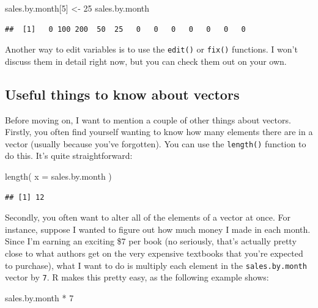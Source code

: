 \documentclass[
]{book}
\newenvironment{Shaded}{\begin{snugshade}}{\end{snugshade}}
\newcommand{\AttributeTok}[1]{\textcolor[rgb]{0.77,0.63,0.00}{#1}}
\newcommand{\DecValTok}[1]{\textcolor[rgb]{0.00,0.00,0.81}{#1}}
\newcommand{\FunctionTok}[1]{\textcolor[rgb]{0.00,0.00,0.00}{#1}}
\newcommand{\NormalTok}[1]{#1}
\newcommand{\OtherTok}[1]{\textcolor[rgb]{0.56,0.35,0.01}{#1}}
\newcommand{\SpecialCharTok}[1]{\textcolor[rgb]{0.00,0.00,0.00}{#1}}
\begin{document}
\begin{Shaded}
\begin{Highlighting}[]
\NormalTok{sales.by.month[}\DecValTok{5}\NormalTok{] }\OtherTok{\textless{}{-}} \DecValTok{25}
\NormalTok{sales.by.month}
\end{Highlighting}
\end{Shaded}

\begin{verbatim}
##  [1]   0 100 200  50  25   0   0   0   0   0   0   0
\end{verbatim}

Another way to edit variables is to use the \texttt{edit()} or \texttt{fix()} functions. I won't discuss them in detail right now, but you can check them out on your own.

\hypertarget{veclength}{%
\subsection{Useful things to know about vectors}\label{veclength}}

Before moving on, I want to mention a couple of other things about vectors. Firstly, you often find yourself wanting to know how many elements there are in a vector (usually because you've forgotten). You can use the \texttt{length()} function to do this. It's quite straightforward:

\begin{Shaded}
\begin{Highlighting}[]
\FunctionTok{length}\NormalTok{( }\AttributeTok{x =}\NormalTok{ sales.by.month )}
\end{Highlighting}
\end{Shaded}

\begin{verbatim}
## [1] 12
\end{verbatim}

Secondly, you often want to alter all of the elements of a vector at once. For instance, suppose I wanted to figure out how much money I made in each month. Since I'm earning an exciting \$7 per book (no seriously, that's actually pretty close to what authors get on the very expensive textbooks that you're expected to purchase), what I want to do is multiply each element in the \texttt{sales.by.month} vector by \texttt{7}. R makes this pretty easy, as the following example shows:

\begin{Shaded}
\begin{Highlighting}[]
\NormalTok{sales.by.month }\SpecialCharTok{*} \DecValTok{7}
\end{Highlighting}
\end{Shaded}
\end{document}
